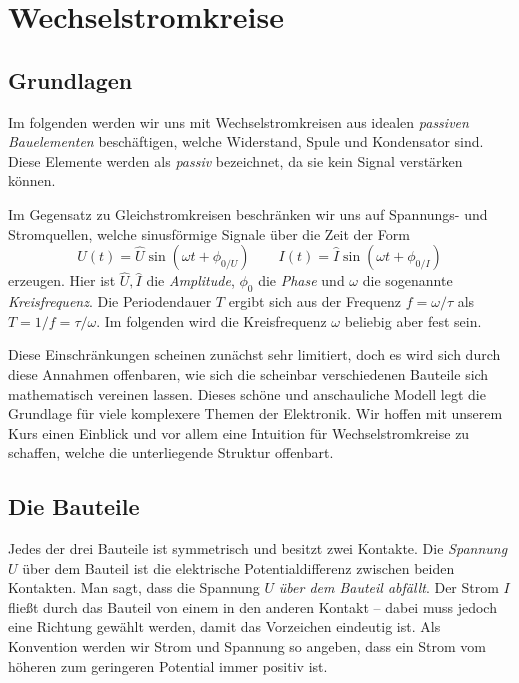 \section{Wechselstromkreise}
\subsection{Grundlagen}
Im folgenden werden wir uns mit Wechselstromkreisen aus idealen \emph{passiven Bauelementen} beschäftigen, welche
Widerstand, Spule und Kondensator sind. Diese Elemente werden als \emph{passiv} bezeichnet, da sie kein Signal
verstärken können.

Im Gegensatz zu Gleichstromkreisen beschränken wir uns auf Spannungs- und Stromquellen, welche sinusförmige Signale über
die Zeit der Form
\begin{equation}\label{eq:sinusform}
    U(t) = \hat U\sin(\omega t + \phi_{0/U}) \qquad
    I(t) = \hat I\sin(\omega t + \phi_{0/I})
\end{equation}
erzeugen. Hier ist $\hat U, \hat I$ die \emph{Amplitude}, $\phi_0$ die \emph{Phase} und  $\omega$ die sogenannte
\emph{Kreisfrequenz}. Die Periodendauer $T$ ergibt sich aus der Frequenz $f = \omega/\tau$ als $T = 1/f = \tau/\omega$.
Im folgenden wird die Kreisfrequenz $\omega$ beliebig aber fest sein.

Diese Einschränkungen scheinen zunächst sehr limitiert, doch es wird sich durch diese Annahmen offenbaren, wie sich die
scheinbar verschiedenen Bauteile sich mathematisch vereinen lassen. Dieses schöne und anschauliche Modell legt die
Grundlage für viele komplexere Themen der Elektronik. Wir hoffen mit unserem Kurs einen Einblick und vor allem eine
Intuition für Wechselstromkreise zu schaffen, welche die unterliegende Struktur offenbart.

\subsection{Die Bauteile}
Jedes der drei Bauteile ist symmetrisch und besitzt zwei Kontakte. Die \emph{Spannung} $U$ über dem Bauteil ist die
elektrische Potentialdifferenz zwischen beiden Kontakten. Man sagt, dass die Spannung $U$ \emph{über dem Bauteil
abfällt}. Der Strom $I$ fließt durch das Bauteil von einem in den anderen Kontakt -- dabei muss jedoch eine Richtung
gewählt werden, damit das Vorzeichen eindeutig ist. Als Konvention werden wir Strom und Spannung so angeben, dass ein
Strom vom höheren zum geringeren Potential immer positiv ist.

